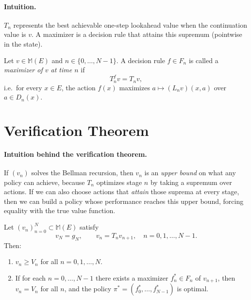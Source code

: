 \paragraph{Intuition.}
$T_n$ represents the best achievable one-step lookahead value when the continuation value is $v$. A maximizer is a decision rule that attains this supremum (pointwise in the state).

\begin{definition}[Maximizer]
Let $v\in\mathcal{\mathbb{M}}(E)$ and $n\in\{0,\dots,N-1\}$. A decision rule $f\in F_n$ is called a \emph{maximizer of $v$ at time $n$} if
\[
T_n^f v = T_n v,
\]
i.e.\ for every $x\in E$, the action $f(x)$ maximizes $a\mapsto (L_n v)(x,a)$ over $a\in D_n(x)$.
\end{definition}

\section{Verification Theorem}

\paragraph{Intuition behind the verification theorem.}
If $(v_n)$ solves the Bellman recursion, then $v_n$ is an \emph{upper bound} on what any policy can achieve, because $T_n$ optimizes stage $n$ by taking a supremum over actions. If we can also choose actions that \emph{attain} those suprema at every stage, then we can build a policy whose performance reaches this upper bound, forcing equality with the true value function.

\begin{theorem}
Let $(v_n)_{n=0}^N\subset\mathcal{\mathbb{M}}(E)$ satisfy
\[
v_N=g_N,\qquad v_n = T_n v_{n+1},\quad n=0,1,\dots,N-1.
\]
Then:
\begin{enumerate}[label=(\alph*)]
  \item $v_n\ge V_n$ for all $n=0,1,\dots,N$.
  \item If for each $n=0,\dots,N-1$ there exists a maximizer $f_n^*\in F_n$ of $v_{n+1}$, then $v_n=V_n$ for all $n$, and the policy $\pi^*=(f_0^*,\dots,f_{N-1}^*)$ is optimal.
\end{enumerate}
\end{theorem}

